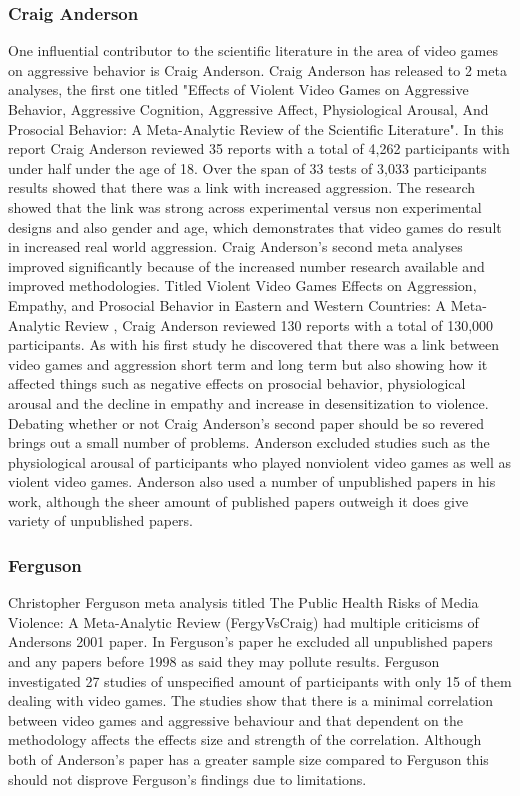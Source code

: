\documentclass[journal]{IEEEtran}
\begin{document}
   \subsubsection{Craig Anderson}
         One influential contributor to the scientific literature in the area of video games on aggressive behavior is Craig Anderson. Craig Anderson has released to 2 meta analyses, the first one titled "Effects of Violent Video Games on Aggressive Behavior, Aggressive Cognition, Aggressive Affect, Physiological Arousal, And Prosocial Behavior: A Meta-Analytic Review of the Scientific Literature"\cite{Craig2001}.  In this report Craig Anderson reviewed 35 reports with a total of 4,262 participants with under half under the age of 18. Over the span of 33 tests of 3,033 participants results showed that there was a link with increased aggression. The research showed that the link was strong across experimental versus non experimental designs and also gender and age, which demonstrates that video games do result in increased real world aggression. Craig Anderson's second meta analyses improved significantly because of the increased number research available and improved methodologies. Titled Violent Video Games Effects on Aggression, Empathy, and Prosocial Behavior in Eastern and Western Countries: A Meta-Analytic Review \cite{Craig2010}, Craig Anderson reviewed 130 reports with a total of 130,000 participants. As with his first study he discovered that there was a link between video games and aggression short term and long term but also showing how it affected things such as negative effects on prosocial behavior, physiological arousal and the decline in empathy and increase in desensitization to violence. Debating whether or not Craig Anderson's second paper should be so revered brings out a small number of problems. Anderson excluded studies such as the physiological arousal of participants who played nonviolent video games as well as violent video games. Anderson also used a number of unpublished papers in his work, although the sheer amount of published papers outweigh it does give variety of unpublished papers.
    
    \subsubsection{Ferguson}
        Christopher Ferguson meta analysis titled The Public Health Risks of Media Violence: A Meta-Analytic Review (FergyVsCraig) had multiple criticisms of Andersons 2001 paper. In Ferguson’s paper he excluded all unpublished papers and any papers before 1998 as said they may pollute results. Ferguson investigated 27 studies of unspecified amount of participants with only 15 of them dealing with video games. The studies show that there is a minimal correlation between video games and aggressive behaviour and that dependent on the methodology affects the effects size and strength of the correlation. Although both of Anderson’s paper has a greater sample size compared to Ferguson this should not disprove Ferguson’s findings due to limitations.
\end{document}
